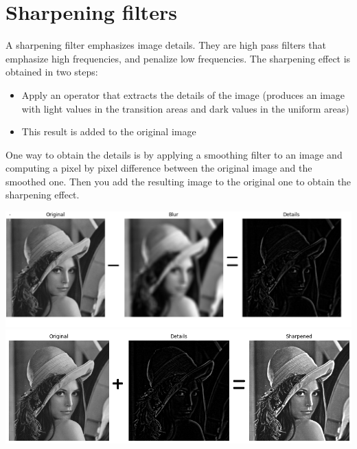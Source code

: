 \section{Sharpening filters}
A sharpening filter emphasizes image details. They are high pass filters that emphasize high frequencies, and penalize low frequencies.\newline
The sharpening effect is obtained in two steps:
\begin{itemize}
    \item Apply an operator that extracts the details of the image (produces an image with light values in the transition areas and dark values in the uniform areas)
    \item This result is added to the original image
\end{itemize}
One way to obtain the details is by applying a smoothing filter to an image and computing a pixel by pixel difference between the original image and the smoothed one. Then you add the resulting image to the original one to obtain the sharpening effect.
\begin{flushleft}
\includegraphics[scale=0.6]{images/details.png}
\includegraphics[scale = 0.8]{images/Lena sharpened.png}
\end{flushleft}
